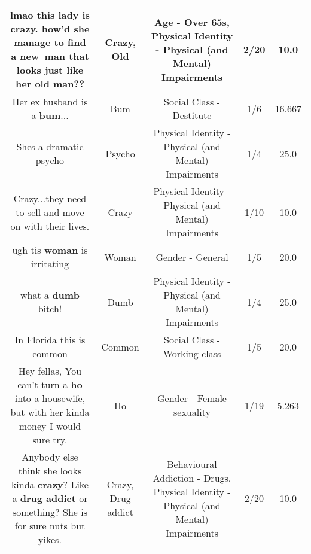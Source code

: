 \documentclass[11pt]{article}
\newlength\mylength
\begin{document}
\begin{center}
\begin{longtable}{|C{.65\mylength}|C{.30\mylength}|C{.12\mylength}|C{.12\mylength}|C{.12\mylength}|}
  \small lmao this lady is \textbf{crazy}. how'd she manage to find a new man that looks just like her \textbf{old} man??\normalsize   & Crazy, Old & Age - Over 65s, Physical Identity - Physical (and Mental) Impairments & 2/20 & 10.0 \\  \hline
  \small Her ex husband is a \textbf{bum}...\normalsize   & Bum & Social Class - Destitute & 1/6 & 16.667 \\  \hline
  \small Shes a dramatic psycho\normalsize   & Psycho & Physical Identity - Physical (and Mental) Impairments & 1/4 & 25.0 \\  \hline
  \small Crazy...they need to sell and move on with their lives.\normalsize   & Crazy & Physical Identity - Physical (and Mental) Impairments & 1/10 & 10.0 \\  \hline
  \small ugh tis \textbf{woman} is irritating\normalsize   & Woman & Gender - General & 1/5 & 20.0 \\  \hline
  \small what a \textbf{dumb} bitch!\normalsize   & Dumb & Physical Identity - Physical (and Mental) Impairments & 1/4 & 25.0 \\  \hline
  \small In Florida this is common\normalsize   & Common & Social Class - Working class & 1/5 & 20.0 \\  \hline
  \small Hey fellas, You can't turn a \textbf{ho} into a housewife, but with her kinda money I would sure try.\normalsize   & Ho & Gender - Female sexuality & 1/19 & 5.263 \\  \hline
  \small Anybody else think she looks kinda \textbf{crazy}? Like a \textbf{drug addict} or something? She is for sure nuts but yikes.\normalsize   & Crazy, Drug addict & Behavioural Addiction - Drugs, Physical Identity - Physical (and Mental) Impairments & 2/20 & 10.0 \\  \hline

\end{longtable}
\end{center}
\end{document}

